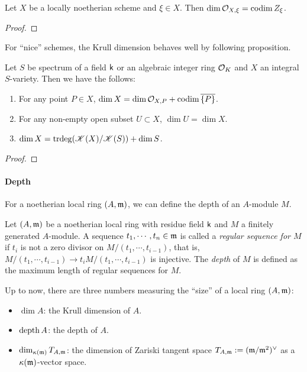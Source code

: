     \begin{proposition}
        Let $X$ be a locally noetherian scheme and $\xi \in X$.
        Then $\dim \mathcal{O}_{X,\xi} = \operatorname{codim} Z_{\xi}$.
    \end{proposition}
    \begin{proof}
    \end{proof}

    For ``nice'' schemes, the Krull dimension behaves well by following proposition.

    \begin{proposition}
        Let $S$ be spectrum of a field $\mathsf{k}$ or an algebraic integer ring $\mathcal{O}_K$ and $X$ an integral $S$-variety.
        Then we have the follows:
        \begin{enumerate}[label=(\roman*)]
            \item For any point $P \in X$, $\dim X = \dim \mathcal{O}_{X,P} + \operatorname{codim} \overline{\{P\}}$.
            \item For any non-empty open subset $U \subset X$, $\dim U = \dim X$.
            \item $\dim X = \operatorname{trdeg}(\mathscr{K}(X)/\mathscr{K}(S)) + \dim S$.
        \end{enumerate}
    \end{proposition}
    \begin{proof}
    \end{proof}


    \paragraph{Depth}

    For a noetherian local ring $(A,{\mathfrak{m}})$, we can define the depth of an $A$-module $M$.

    \begin{definition}
        Let $(A,{\mathfrak{m}})$ be a noetherian local ring with residue field $\mathsf{k}$ and $M$ a finitely generated $A$-module. 
        A sequence $t_1,\cdots,t_n\in {\mathfrak{m}}$ is called a \textit{regular sequence for $M$} if $t_i$ is not a zero divisor on $M/(t_1,\cdots,t_{i-1})$, that is, $M/(t_1,\cdots,t_{i-1}) \to t_iM/(t_1,\cdots,t_{i-1})$ is injective.
        The \textit{depth} of $M$ is defined as the maximum length of regular sequences for $M$.
    \end{definition}

    Up to now, there are three numbers measuring the ``size'' of a local ring $(A,{\mathfrak{m}})$:
    \begin{itemize}
        \item $\dim A$: the Krull dimension of $A$.
        \item $\operatorname{depth} A$: the depth of $A$.
        \item $\dim_{\kappa({\mathfrak{m}})} T_{A,{\mathfrak{m}}}$: the dimension of Zariski tangent space $T_{A,{\mathfrak{m}}} := ({\mathfrak{m}}/{\mathfrak{m}}^2)^\lor$ as a ${\kappa({\mathfrak{m}})}$-vector space.
    \end{itemize}

